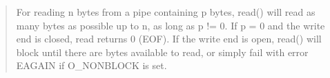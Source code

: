 \documentclass[letterpaper,10pt,onecolumn,titlepage]{article}
\begin{document}
\begin{enumerate}
\begin{quote}
For reading n bytes from a pipe containing p bytes, read() will read as many bytes as possible up to n, as long as p != 0.  If p = 0 and the write end is closed, read returns 0 (EOF).  If the write end is open, read() will block until there are bytes available to read, or simply fail with error EAGAIN if O\_NONBLOCK is set.
\end{quote}

\end{enumerate}

\end{document}
